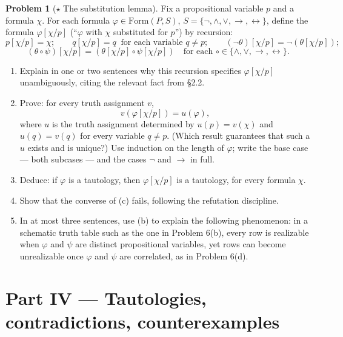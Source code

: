 \documentclass[11pt]{article}
\newcommand{\Form}{\mathrm{Form}}
\newcommand{\Sfive}{\{\lnot,\land,\lor,\to,\leftrightarrow\}}
\theoremstyle{definition}
\newtheorem{problem}{Problem}
\begin{document}
\begin{problem}[$\star$ The substitution lemma]
Fix a propositional variable $p$ and a formula $\chi$. For each formula
$\varphi\in\Form(P,S)$, $S=\Sfive$, define the formula $\varphi[\chi/p]$
(``$\varphi$ with $\chi$ substituted for $p$'') by recursion:
\[
p[\chi/p]=\chi;\qquad
q[\chi/p]=q\ \text{ for each variable }q\ne p;\qquad
(\lnot\theta)[\chi/p]=\lnot(\theta[\chi/p]);
\]
\[
(\theta\circ\psi)[\chi/p]=(\theta[\chi/p]\circ\psi[\chi/p])
\quad\text{for each }\circ\in\{\land,\lor,\to,\leftrightarrow\}.
\]
\begin{enumerate}
\item[(a)] Explain in one or two sentences why this recursion specifies
$\varphi[\chi/p]$ unambiguously, citing the relevant fact from \S 2.2.
\item[(b)] Prove: for every truth assignment $v$,
\[
v(\varphi[\chi/p])=u(\varphi),
\]
where $u$ is the truth assignment determined by $u(p)=v(\chi)$ and $u(q)=v(q)$ for
every variable $q\ne p$. (Which result guarantees that such a $u$ exists and is
unique?) Use induction on the length of $\varphi$; write the base case --- both
subcases --- and the cases $\lnot$ and $\to$ in full.
\item[(c)] Deduce: if $\varphi$ is a tautology, then $\varphi[\chi/p]$ is a
tautology, for every formula $\chi$.
\item[(d)] Show that the converse of (c) fails, following the refutation
discipline.
\item[(e)] In at most three sentences, use (b) to explain the following
phenomenon: in a schematic truth table such as the one in Problem 6(b), every row
is realizable when $\varphi$ and $\psi$ are distinct propositional variables, yet
rows can become unrealizable once $\varphi$ and $\psi$ are correlated, as in
Problem 6(d).
\end{enumerate}
\end{problem}

\section*{Part IV --- Tautologies, contradictions, counterexamples}
\end{document}
